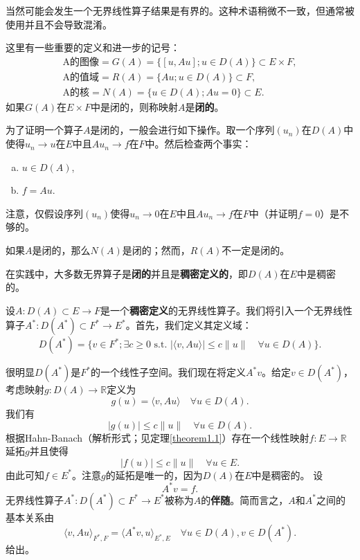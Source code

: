 \begin{remark}
当然可能会发生一个无界线性算子结果是有界的。这种术语稍微不一致，但通常被使用并且不会导致混淆。
\end{remark}

这里有一些重要的定义和进一步的记号：
\begin{gather*}
\text{A的图像} = G(A) = \{[u, Au]; u \in D(A)\} \subset E \times F, \\
\text{A的值域} = R(A) = \{Au; u \in D(A)\} \subset F, \\
\text{A的核} = N(A) = \{u \in D(A); Au=0\} \subset E.
\end{gather*}
如果$G(A)$在$E \times F$中是闭的，则称映射$A$是\textbf{闭的}。

\begin{remark}
为了证明一个算子$A$是闭的，一般会进行如下操作。取一个序列$(u_n)$在$D(A)$中使得$u_n \to u$在$E$中且$Au_n \to f$在$F$中。然后检查两个事实：
\begin{enumerate}[(a)]
    \item $u \in D(A)$,
    \item $f=Au$.
\end{enumerate}
注意，仅假设序列$(u_n)$使得$u_n \to 0$在$E$中且$Au_n \to f$在$F$中（并证明$f=0$）是不够的。
\end{remark}

\begin{remark}
如果$A$是闭的，那么$N(A)$是闭的；然而，$R(A)$不一定是闭的。
\end{remark}

\begin{remark}
在实践中，大多数无界算子是\textbf{闭的}并且是\textbf{稠密定义的}，即$D(A)$在$E$中是稠密的。
\end{remark}

\begin{definition}
设$A:D(A) \subset E \to F$是一个\textbf{稠密定义}的无界线性算子。我们将引入一个无界线性算子$A^*: D(A^*) \subset F^* \to E^*$。首先，我们定义其定义域：
\[ D(A^*) = \{v \in F^*; \exists c \geq 0 \text{ s.t. } |\langle v, Au \rangle| \leq c\|u\| \quad \forall u \in D(A)\}. \]
\end{definition}

很明显$D(A^*)$是$F^*$的一个线性子空间。我们现在将定义$A^*v$。给定$v \in D(A^*)$，考虑映射$g:D(A) \to \mathbb{R}$定义为
\[ g(u) = \langle v, Au \rangle \quad \forall u \in D(A). \]
我们有
\[ |g(u)| \leq c\|u\| \quad \forall u \in D(A). \]
根据Hahn-Banach（解析形式；见定理\ref{theorem1.1}）存在一个线性映射$f:E \to \mathbb{R}$延拓$g$并且使得
\[ |f(u)| \leq c\|u\| \quad \forall u \in E. \]
由此可知$f \in E^*$。注意$g$的延拓是唯一的，因为$D(A)$在$E$中是稠密的。
设
\[ A^*v = f. \]
无界线性算子$A^*:D(A^*) \subset F^* \to E^*$被称为$A$的\textbf{伴随}。简而言之，$A$和$A^*$之间的基本关系由
\[ \langle v, Au \rangle_{F^*,F} = \langle A^*v, u \rangle_{E^*,E} \quad \forall u \in D(A), v \in D(A^*). \]
给出。


